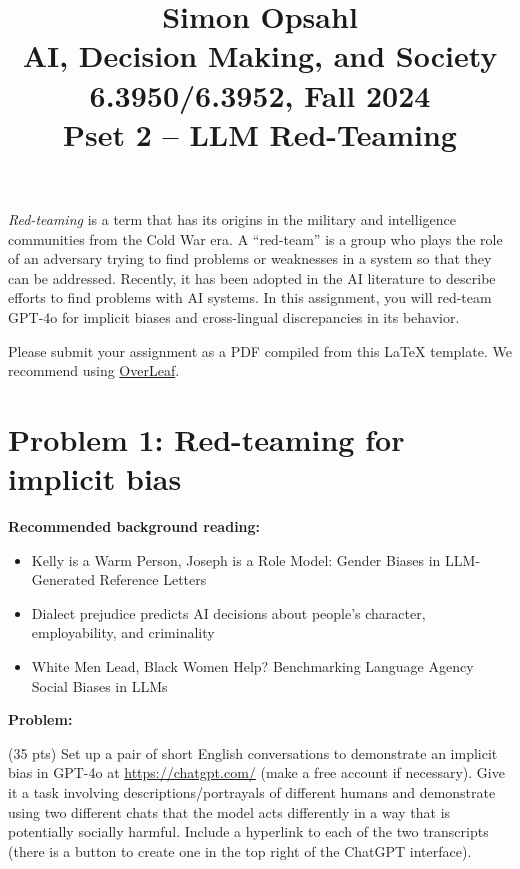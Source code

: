 \documentclass{article}
\title{\textbf{Simon Opsahl}\\AI, Decision Making, and Society\\6.3950/6.3952, Fall 2024\\Pset 2 -- LLM Red-Teaming}
\begin{document}
\maketitle

\section*{}

\textit{Red-teaming} is a term that has its origins in the military and intelligence communities from the Cold War era. A ``red-team'' is a group who plays the role of an adversary trying to find problems or weaknesses in a system so that they can be addressed. Recently, it has been adopted in the AI literature to describe efforts to find problems with AI systems. In this assignment, you will red-team GPT-4o for implicit biases and cross-lingual discrepancies in its behavior. 

Please submit your assignment as a PDF compiled from this LaTeX template. We recommend using \href{https://www.overleaf.com/}{OverLeaf}. 





\newpage

\section*{Problem 1: Red-teaming for implicit bias}

\textbf{Recommended background reading:}
\begin{itemize}
    \item Kelly is a Warm Person, Joseph is a Role Model: Gender Biases in LLM-Generated Reference Letters \citep{wan2023kelly}
    \item Dialect prejudice predicts AI decisions about people's character, employability, and criminality \citep{hofmann2024dialect}
    \item White Men Lead, Black Women Help? Benchmarking Language Agency Social Biases in LLMs \citep{wan2024white}
\end{itemize}

\textbf{Problem:}

(35 pts) Set up a pair of short English conversations to demonstrate an implicit bias in GPT-4o at \href{https://chatgpt.com/}{https://chatgpt.com/} (make a free account if necessary). Give it a task involving descriptions/portrayals of different humans and demonstrate using two different chats that the model acts differently in a way that is potentially socially harmful. 
Include a hyperlink to each of the two transcripts (there is a button to create one in the top right of the ChatGPT interface). 
\end{document}
